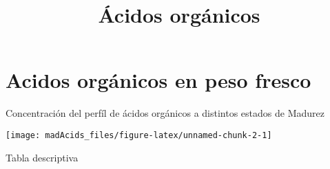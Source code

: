\documentclass[
]{article}
\title{Ácidos orgánicos}
\author{}
\date{\vspace{-2.5em}}
\begin{document}
\maketitle

{
\setcounter{tocdepth}{2}
\tableofcontents
}
\section{Acidos orgánicos en peso
fresco}\label{acidos-orguxe1nicos-en-peso-fresco}

Concentración del perfíl de ácidos orgánicos a distintos estados de
Madurez

\begin{center}\texttt{[image: madAcids\_files/figure-latex/unnamed-chunk-2-1]} \end{center}

Tabla descriptiva
\end{document}
